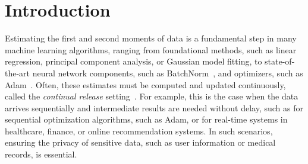 \section{Introduction}

Estimating the first and second moments of data is a fundamental step in many machine learning algorithms, ranging from foundational methods, such as linear regression, principal component analysis, or Gaussian model fitting, to state-of-the-art neural network components, such as BatchNorm~\citep{pmlr-v37-ioffe15}, and optimizers, such as Adam~\citep{kingma2014adam}. 
%
Often, these estimates must be computed and updated continuously, called the \emph{continual release} setting~\citep{dwork2010differential}. 
%
For example, this is the case when the data arrives sequentially and 
intermediate results are needed without delay, such as for sequential optimization algorithms, such as Adam, or for real-time systems in healthcare, finance, or online recommendation systems. In such scenarios, ensuring the privacy of sensitive data, such as user information or medical records, is essential.
%

